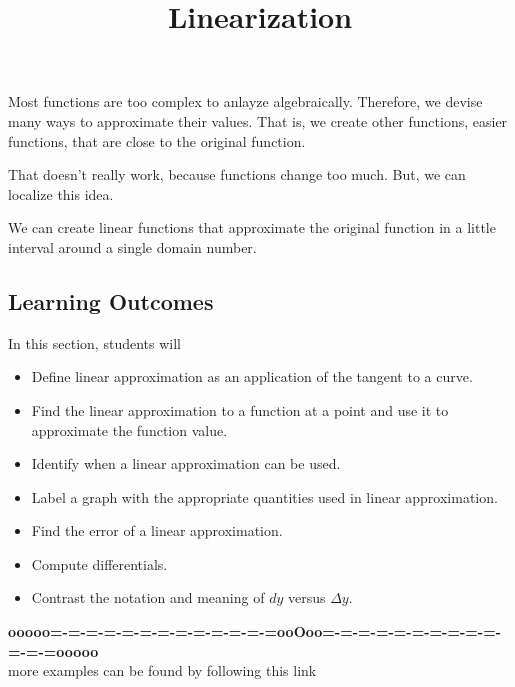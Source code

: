 \documentclass{ximera}
\title{Linearization}
\begin{document}
\begin{abstract}
\end{abstract}
\maketitle







Most functions are too complex to anlayze algebraically. Therefore, we devise many ways to approximate their values. That is, we create other functions, easier functions, that are close to the original function.

That doesn't really work, because functions change too much.  But, we can localize this idea.

We can create linear functions that approximate the original function in a little interval around a single domain number.











\subsection{Learning Outcomes}


\begin{sectionOutcomes}
In this section, students will 

\begin{itemize}
\item Define linear approximation as an application of the tangent to a curve.
\item Find the linear approximation to a function at a point and use it to approximate the function value.
\item Identify when a linear approximation can be used.
\item Label a graph with the appropriate quantities used in linear approximation.
\item Find the error of a linear approximation.
\item Compute differentials.
\item Contrast the notation and meaning of $dy$ versus $\Delta y$.
\end{itemize}
\end{sectionOutcomes}









\begin{center}
\textbf{\textcolor{green!50!black}{ooooo=-=-=-=-=-=-=-=-=-=-=-=-=ooOoo=-=-=-=-=-=-=-=-=-=-=-=-=ooooo}} \\

more examples can be found by following this link\\ 

\end{center}
\end{document}
